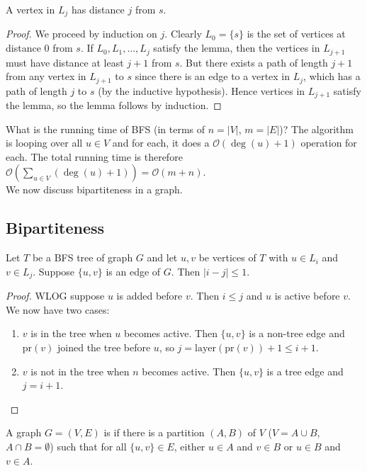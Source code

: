 \documentclass[12pt]{scrartcl}
\begin{document}
\begin{lemma}
    A vertex in $L_j$ has distance $j$ from $s$.
\end{lemma}

\begin{proof}
    We proceed by induction on $j$. Clearly $L_0 = \{s\}$ is the set of vertices at distance $0$ from $s$. If $L_0, L_1, \ldots, L_j$ satisfy the lemma, then the vertices in $L_{j+1}$ must have distance at least $j+1$ from $s$. But there exists a path of length $j+1$ from any vertex in $L_{j+1}$ to $s$ since there is an edge to a vertex in $L_j$, which has a path of length $j$ to $s$ (by the inductive hypothesis). Hence vertices in $L_{j+1}$ satisfy the lemma, so the lemma follows by induction.
\end{proof}

What is the running time of BFS (in terms of $n=|V|$, $m=|E|$)? The algorithm is looping over all $u \in V$ and for each, it does a $\mathcal{O}(\deg(u) + 1)$ operation for each. The total running time is therefore $\mathcal{O}\left(\sum_{u\in V}(\deg(u)+1)\right) = \mathcal{O}(m+n)$. \\

We now discuss bipartiteness in a graph.

\subsection{Bipartiteness}
\begin{lemma}
    Let $T$ be a BFS tree of graph $G$ and let $u, v$ be vertices of $T$ with $u \in L_i$ and $v \in L_j$. Suppose $\{u, v\}$ is an edge of $G$. Then $|i-j| \leq 1$.
\end{lemma}

\begin{proof}
    WLOG suppose $u$ is added before $v$. Then $i \leq j$ and $u$ is active before $v$. We now have two cases:
        \begin{enumerate}
            \item $v$ is in the tree when $u$ becomes active. Then $\{u, v\}$ is a non-tree edge and $\text{pr}(v)$ joined the tree before $u$, so $j = \text{layer}(\text{pr}(v)) + 1 \leq i+1$.

            \item $v$ is not in the tree when $n$ becomes active. Then $\{u, v\}$ is a tree edge and $j=i+1$.
        \end{enumerate}
\end{proof}
\begin{definition}
    A graph $G = (V, E)$ is  if there is a partition $(A, B)$ of $V$ ($V = A \cup B$, $A \cap B = \emptyset$) such that for all $\{u, v\} \in E$, either $u \in A$ and $v \in B$ or $u \in B$ and $v \in A$.
\end{definition}
\end{document}
